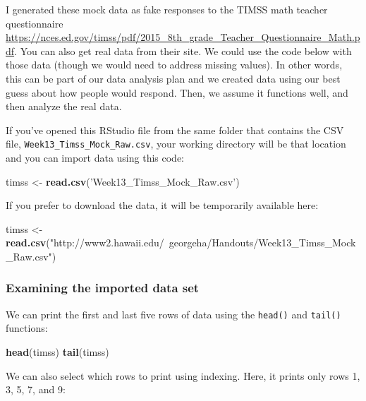 \documentclass[
]{article}
\newenvironment{Shaded}{\begin{snugshade}}{\end{snugshade}}
\newcommand{\KeywordTok}[1]{\textcolor[rgb]{0.13,0.29,0.53}{\textbf{#1}}}
\newcommand{\NormalTok}[1]{#1}
\newcommand{\StringTok}[1]{\textcolor[rgb]{0.31,0.60,0.02}{#1}}
\begin{document}
I generated these mock data as fake responses to the TIMSS math teacher questionnaire \url{https://nces.ed.gov/timss/pdf/2015_8th_grade_Teacher_Questionnaire_Math.pdf}. You can also get real data from their site. We could use the code below with those data (though we would need to address missing values). In other words, this can be part of our data analysis plan and we created data using our best guess about how people would respond. Then, we assume it functions well, and then analyze the real data.

If you've opened this RStudio file from the same folder that contains the CSV file, \texttt{Week13\_Timss\_Mock\_Raw.csv}, your working directory will be that location and you can import data using this code:

\begin{Shaded}
\begin{Highlighting}[]
\NormalTok{timss <-}\StringTok{ }\KeywordTok{read.csv}\NormalTok{(}\StringTok{'Week13_Timss_Mock_Raw.csv'}\NormalTok{) }
\end{Highlighting}
\end{Shaded}

If you prefer to download the data, it will be temporarily available here:

\begin{Shaded}
\begin{Highlighting}[]
\NormalTok{timss <-}\StringTok{ }\KeywordTok{read.csv}\NormalTok{(}\StringTok{"http://www2.hawaii.edu/~georgeha/Handouts/Week13_Timss_Mock_Raw.csv"}\NormalTok{)}
\end{Highlighting}
\end{Shaded}

\hypertarget{examining-the-imported-data-set}{%
\subsubsection{Examining the imported data set}\label{examining-the-imported-data-set}}

We can print the first and last five rows of data using the \texttt{head()} and \texttt{tail()} functions:

\begin{Shaded}
\begin{Highlighting}[]
\KeywordTok{head}\NormalTok{(timss)}
\KeywordTok{tail}\NormalTok{(timss)}
\end{Highlighting}
\end{Shaded}

We can also select which rows to print using indexing. Here, it prints only rows 1, 3, 5, 7, and 9:
\end{document}
